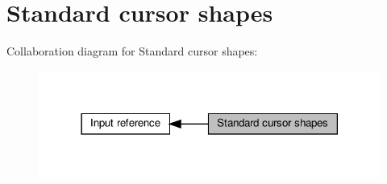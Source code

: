 \hypertarget{group__shapes}{}\section{Standard cursor shapes}
\label{group__shapes}
Collaboration diagram for Standard cursor shapes\+:
\nopagebreak
\begin{figure}[H]
\begin{center}
\leavevmode
\includegraphics[width=318pt]{group__shapes}
\end{center}
\end{figure}
